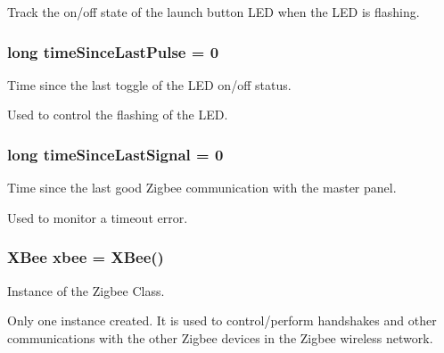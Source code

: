\-Track the on/off state of the launch button \-L\-E\-D when the \-L\-E\-D is flashing. 

\hypertarget{remotePanel_8ino_af8d9d76d18b6aee4b209d4f3b9f2d8d3}{
\subsubsection[{time\-Since\-Last\-Pulse}]{\setlength{\rightskip}{0pt plus 5cm}long {\bf time\-Since\-Last\-Pulse} = 0}}\label{remotePanel_8ino_af8d9d76d18b6aee4b209d4f3b9f2d8d3}


\-Time since the last toggle of the \-L\-E\-D on/off status. 

\-Used to control the flashing of the \-L\-E\-D. \hypertarget{remotePanel_8ino_a925c32c87cdf25a3c9fde672e4dffec6}{
\subsubsection[{time\-Since\-Last\-Signal}]{\setlength{\rightskip}{0pt plus 5cm}long {\bf time\-Since\-Last\-Signal} = 0}}\label{remotePanel_8ino_a925c32c87cdf25a3c9fde672e4dffec6}


\-Time since the last good \-Zigbee communication with the master panel. 

\-Used to monitor a timeout error. \hypertarget{remotePanel_8ino_a18bbd7dece9ef587254b08710426fd17}{
\subsubsection[{xbee}]{\setlength{\rightskip}{0pt plus 5cm}\-X\-Bee {\bf xbee} = \-X\-Bee()}}\label{remotePanel_8ino_a18bbd7dece9ef587254b08710426fd17}


\-Instance of the \-Zigbee \-Class. 

\-Only one instance created. \-It is used to control/perform handshakes and other communications with the other \-Zigbee devices in the \-Zigbee wireless network. 